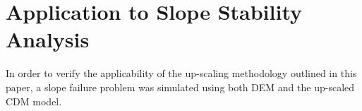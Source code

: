 \section{Application to Slope Stability Analysis}

In order to verify the applicability of the up-scaling methodology outlined in this paper, a slope failure problem was simulated using both DEM and the up-scaled CDM model. 